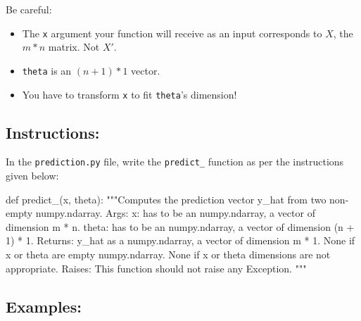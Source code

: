 \documentclass[]{article}
\newenvironment{Shaded}{\begin{snugshade}}{\end{snugshade}}
\newcommand{\CommentTok}[1]{\textcolor[rgb]{0.48,0.49,0.49}{#1}}
\newcommand{\KeywordTok}[1]{\textcolor[rgb]{0.81,0.81,0.76}{#1}}
\newcommand{\NormalTok}[1]{\textcolor[rgb]{0.81,0.81,0.76}{#1}}
\begin{document}
Be careful:

\begin{itemize}
\item
  The \texttt{x} argument your function will receive as an input
  corresponds to \(X\), the \(m * n\) matrix. Not \(X'\).
\item
  \texttt{theta} is an \((n + 1) * 1\) vector.
\item
  You have to transform \texttt{x} to fit \texttt{theta}'s dimension!
\end{itemize}

\hypertarget{instructions-2}{%
\subsection{Instructions:}\label{instructions-2}}

In the \texttt{prediction.py} file, write the \texttt{predict\_}
function as per the instructions given below:

\begin{Shaded}
\begin{Highlighting}[]
\KeywordTok{def}\NormalTok{ predict_(x, theta):}
    \CommentTok{"""Computes the prediction vector y_hat from two non-empty numpy.ndarray.}
\CommentTok{    Args:}
\CommentTok{      x: has to be an numpy.ndarray, a vector of dimension m * n.}
\CommentTok{      theta: has to be an numpy.ndarray, a vector of dimension (n + 1) * 1.}
\CommentTok{    Returns:}
\CommentTok{      y_hat as a numpy.ndarray, a vector of dimension m * 1.}
\CommentTok{      None if x or theta are empty numpy.ndarray.}
\CommentTok{      None if x or theta dimensions are not appropriate.}
\CommentTok{    Raises:}
\CommentTok{      This function should not raise any Exception.}
\CommentTok{    """}
\end{Highlighting}
\end{Shaded}

\hypertarget{examples-2}{%
\subsection{Examples:}\label{examples-2}}
\end{document}
